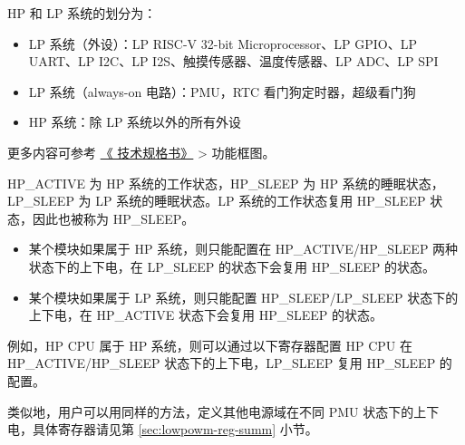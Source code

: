 \documentclass[main\_\_CN.tex]{subfiles}
\begin{document}
\begin{tiplisting}
\vspace{-0.5em}
HP 和 LP 系统的划分为：

    \begin{itemize}
    \item LP 系统（外设）：LP RISC-V 32-bit Microprocessor、LP GPIO、LP UART、LP I2C、LP I2S、触摸传感器、温度传感器、LP ADC、LP SPI
    \item LP 系统（always-on 电路）：PMU，RTC 看门狗定时器，超级看门狗
    \item HP 系统：除 LP 系统以外的所有外设
    \end{itemize}

    更多内容可参考 \href{https://www.espressif.com/sites/default/files/documentation/esp32-p4_datasheet_cn.pdf}{《\chipname{} 技术规格书》} > 功能框图。
\end{tiplisting}

HP\_ACTIVE 为 HP 系统的工作状态，HP\_SLEEP 为 HP 系统的睡眠状态，LP\_SLEEP 为 LP 系统的睡眠状态。LP 系统的工作状态复用 HP\_SLEEP 状态，因此也被称为 HP\_SLEEP。

\begin{itemize}
\item 某个模块如果属于 HP 系统，则只能配置在 HP\_ACTIVE/HP\_SLEEP 两种状态下的上下电，在 LP\_SLEEP 的状态下会复用 HP\_SLEEP 的状态。
\item 某个模块如果属于 LP 系统，则只能配置 HP\_SLEEP/LP\_SLEEP 状态下的上下电，在 HP\_ACTIVE 状态下会复用 HP\_SLEEP 的状态。
\end{itemize}

例如，HP CPU 属于 HP 系统，则可以通过以下寄存器配置 HP CPU 在 HP\_ACTIVE/HP\_SLEEP 状态下的上下电，LP\_SLEEP 复用 HP\_SLEEP 的配置。

\begin{itemize}
\end{itemize}

类似地，用户可以用同样的方法，定义其他电源域在不同 PMU 状态下的上下电，具体寄存器请见第 \ref{sec:lowpowm-reg-summ} 小节。
\end{document}
